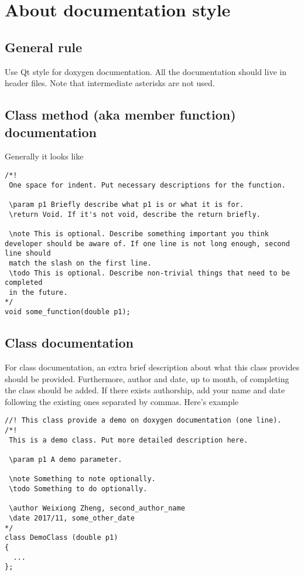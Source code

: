 \documentclass{article}
\begin{document}
\section{About documentation style}
\subsection{General rule}
Use Qt style for doxygen documentation. All the documentation should live in header files. Note that intermediate asterisks are not used.
\subsection{Class method (aka member function) documentation}
Generally it looks like
\begin{lstlisting}
/*!
 One space for indent. Put necessary descriptions for the function.
 
 \param p1 Briefly describe what p1 is or what it is for.
 \return Void. If it's not void, describe the return briefly.
 
 \note This is optional. Describe something important you think developer should be aware of. If one line is not long enough, second line should
 match the slash on the first line.
 \todo This is optional. Describe non-trivial things that need to be completed 
 in the future.
*/
void some_function(double p1);
\end{lstlisting}

\subsection{Class documentation}
For class documentation, an extra brief description about what this class provides should be provided. Furthermore, author and date, up to month, of completing the class should be added. If there exists authorship, add your name and date following the existing ones separated by commas. Here's example
\begin{lstlisting}
//! This class provide a demo on doxygen documentation (one line).
/*!
 This is a demo class. Put more detailed description here.
 
 \param p1 A demo parameter.
 
 \note Something to note optionally.
 \todo Something to do optionally.
 
 \author Weixiong Zheng, second_author_name
 \date 2017/11, some_other_date
*/
class DemoClass (double p1)
{
  ...
};
\end{lstlisting}
\end{document}
